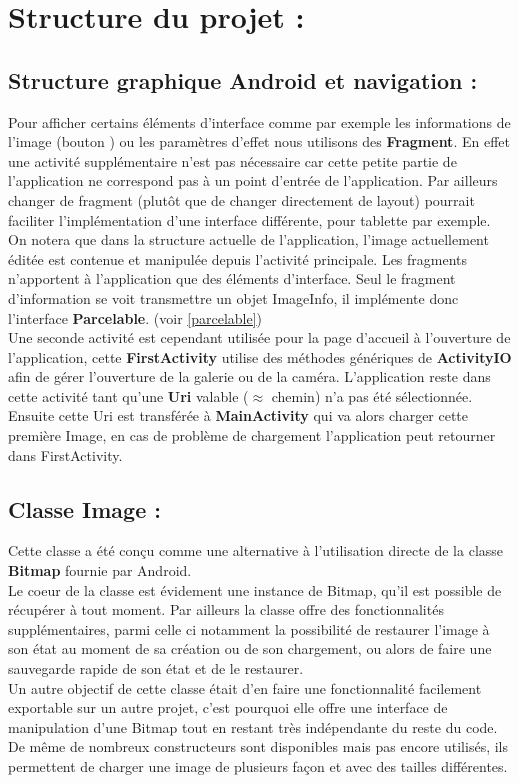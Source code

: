\section{Structure du projet :}

\subsection{Structure graphique Android et navigation :} \label{navig}
Pour afficher certains éléments d'interface comme par exemple les informations de l'image (bouton \faInfoCircle) ou les paramètres d'effet nous utilisons des \textbf{Fragment}. En effet une activité supplémentaire n'est pas nécessaire car cette petite partie de l'application ne correspond pas à un point d'entrée de l'application. Par ailleurs changer de fragment (plutôt que de changer directement de layout) pourrait faciliter l'implémentation d'une interface différente, pour tablette par exemple.
\\

On notera que dans la structure actuelle de l'application, l'image actuellement éditée est contenue et manipulée depuis l'activité principale. Les fragments n'apportent à l'application que des éléments d'interface. Seul le fragment d'information se voit transmettre un objet ImageInfo, il implémente donc l'interface \textbf{Parcelable}. (voir \ref{parcelable})
\\

Une seconde activité est cependant utilisée pour la page d'accueil à l'ouverture de l'application, cette \textbf{FirstActivity} utilise des méthodes génériques de \textbf{ActivityIO} afin de gérer l'ouverture de la galerie ou de la caméra. L'application reste dans cette activité tant qu'une \textbf{Uri} valable ($\approx$ chemin) n'a pas été sélectionnée. Ensuite cette Uri est transférée à \textbf{MainActivity} qui va alors charger cette première Image, en cas de problème de chargement l'application peut retourner dans FirstActivity.

\subsection{Classe \textbf{Image} :} \label{classeImage}
Cette classe a été conçu comme une alternative à l'utilisation directe de la classe \textbf{Bitmap} fournie par Android.
\\
Le coeur de la classe est évidement une instance de Bitmap, qu'il est possible de récupérer à tout moment. Par ailleurs la classe offre des fonctionnalités supplémentaires, parmi celle ci notamment la possibilité de restaurer l'image à son état au moment de sa création ou de son chargement, ou alors de faire une sauvegarde rapide de son état et de le restaurer.
\\
Un autre objectif de cette classe était d'en faire une fonctionnalité facilement exportable sur un autre projet, c'est pourquoi elle offre une interface de manipulation d'une Bitmap tout en restant très indépendante du reste du code. De même de nombreux constructeurs sont disponibles mais pas encore utilisés, ils permettent de charger une image de plusieurs façon et avec des tailles différentes.

